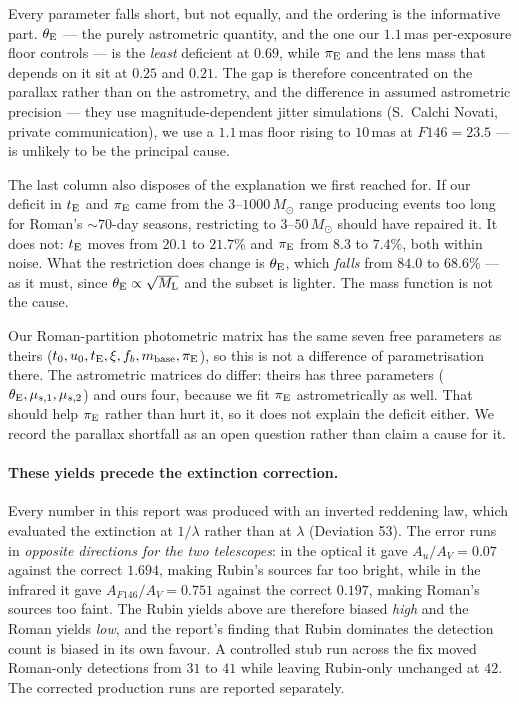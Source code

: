 \documentclass[english,10pt,a4paper]{article}
\newcommand{\tE}{t_{\rm E}}
\newcommand{\piE}{\pi_{\rm E}}
\newcommand{\tetE}{\theta_{\rm E}}
\newcommand{\Ml}{M_{\rm L}}
\newcommand{\Msun}{M_\odot}
\begin{document}
Every parameter falls short, but not equally, and the ordering is the informative part.
$\tetE$ --- the purely astrometric quantity, and the one our $1.1$\,mas per-exposure floor
controls --- is the \emph{least} deficient at $0.69$, while $\piE$ and the lens mass that depends
on it sit at $0.25$ and $0.21$. The gap is therefore concentrated on the parallax rather than on
the astrometry, and the difference in assumed astrometric precision --- they use
magnitude-dependent jitter simulations (S.\ Calchi Novati, private communication), we use a
$1.1$\,mas floor rising to $10$\,mas at $F146 = 23.5$ --- is unlikely to be the principal cause.

The last column also disposes of the explanation we first reached for. If our deficit in $\tE$ and
$\piE$ came from the $3$--$1000\,\Msun$ range producing events too long for Roman's $\sim\!70$-day
seasons, restricting to $3$--$50\,\Msun$ should have repaired it. It does not: $\tE$ moves from
$20.1$ to $21.7\%$ and $\piE$ from $8.3$ to $7.4\%$, both within noise. What the restriction does
change is $\tetE$, which \emph{falls} from $84.0$ to $68.6\%$ --- as it must, since
$\tetE \propto \sqrt{\Ml}$ and the subset is lighter. The mass function is not the cause.

Our Roman-partition photometric matrix has the same seven free parameters as theirs
($t_0,u_0,\tE,\xi,f_b,m_{\rm base},\piE$), so this is not a difference of parametrisation there.
The astrometric matrices do differ: theirs has three parameters ($\tetE,\mu_{s,1},\mu_{s,2}$) and
ours four, because we fit $\piE$ astrometrically as well. That should help $\piE$ rather than hurt
it, so it does not explain the deficit either. We record the parallax shortfall as an open
question rather than claim a cause for it.

\paragraph{These yields precede the extinction correction.} Every number in this report was
produced with an inverted \citet{Cardelli1989} reddening law, which evaluated the
extinction at $1/\lambda$ rather than at $\lambda$ (Deviation 53). The error runs in
\emph{opposite directions for the two telescopes}: in the optical it gave $A_u/A_V = 0.07$ against
the correct $1.694$, making Rubin's sources far too bright, while in the infrared it gave
$A_{F146}/A_V = 0.751$ against the correct $0.197$, making Roman's sources too faint. The Rubin
yields above are therefore biased \emph{high} and the Roman yields \emph{low}, and the report's
finding that Rubin dominates the detection count is biased in its own favour. A controlled stub
run across the fix moved Roman-only detections from $31$ to $41$ while leaving Rubin-only
unchanged at $42$. The corrected production runs are reported separately.
\end{document}
